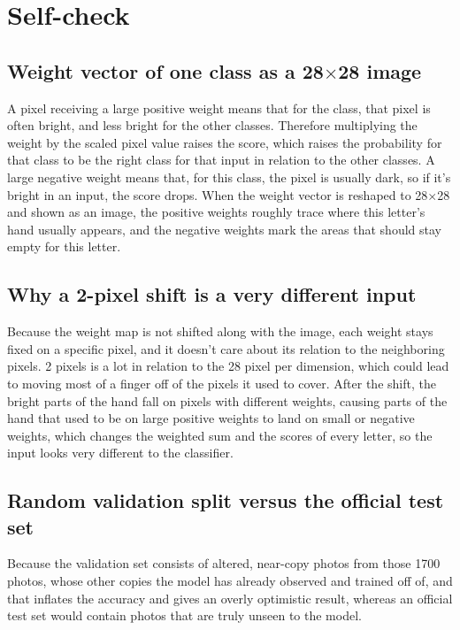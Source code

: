 \section{Self-check}

\subsection{Weight vector of one class as a 28$\times$28 image}

A pixel receiving a large positive weight means that for the class, that pixel is often bright, and less bright for the other classes. Therefore multiplying the weight by the scaled pixel value raises the score, which raises the probability for that class to be the right class for that input in relation to the other classes. A large negative weight means that, for this class, the pixel is usually dark, so if it’s bright in an input, the score drops. When the weight vector is reshaped to 28$\times$28 and shown as an image, the positive weights roughly trace where this letter’s hand usually appears, and the negative weights mark the areas that should stay empty for this letter.

\subsection{Why a 2-pixel shift is a very different input}

Because the weight map is not shifted along with the image, each weight stays fixed on a specific pixel, and it doesn't care about its relation to the neighboring pixels. 2 pixels is a lot in relation to the 28 pixel per dimension, which could lead to moving most of a finger off of the pixels it used to cover. After the shift, the bright parts of the hand fall on pixels with different weights, causing parts of the hand that used to be on large positive weights to land on small or negative weights, which changes the weighted sum and the scores of every letter, so the input looks very different to the classifier.

\subsection{Random validation split versus the official test set}

Because the validation set consists of altered, near-copy photos from those 1700 photos, whose other copies the model has already observed and trained off of, and that inflates the accuracy and gives an overly optimistic result, whereas an official test set would contain photos that are truly unseen to the model.

